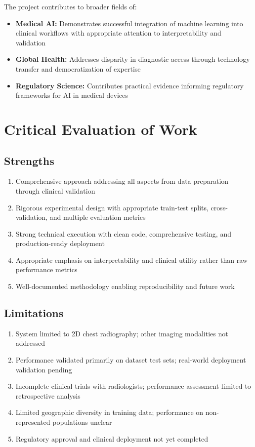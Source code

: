 {The project contributes to broader fields of:

\begin{itemize}
    \item \textbf{Medical AI:} Demonstrates successful integration of machine learning into clinical workflows with appropriate attention to interpretability and validation
    \item \textbf{Global Health:} Addresses disparity in diagnostic access through technology transfer and democratization of expertise
    \item \textbf{Regulatory Science:} Contributes practical evidence informing regulatory frameworks for AI in medical devices
\end{itemize}

\section{Critical Evaluation of Work}

\subsection{Strengths}

\begin{enumerate}
    \item Comprehensive approach addressing all aspects from data preparation through clinical validation
    \item Rigorous experimental design with appropriate train-test splits, cross-validation, and multiple evaluation metrics
    \item Strong technical execution with clean code, comprehensive testing, and production-ready deployment
    \item Appropriate emphasis on interpretability and clinical utility rather than raw performance metrics
    \item Well-documented methodology enabling reproducibility and future work
\end{enumerate}

\subsection{Limitations}

\begin{enumerate}
    \item System limited to 2D chest radiography; other imaging modalities not addressed
    \item Performance validated primarily on dataset test sets; real-world deployment validation pending
    \item Incomplete clinical trials with radiologists; performance assessment limited to retrospective analysis
    \item Limited geographic diversity in training data; performance on non-represented populations unclear
    \item Regulatory approval and clinical deployment not yet completed
\end{enumerate}

}
